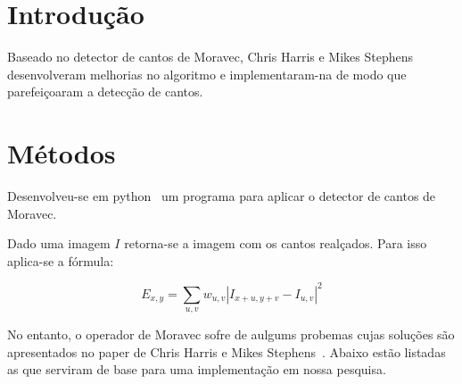 \documentclass[10pt,a4paper]{article}
\begin{document}
\vspace{2mm}
\newpage

\section{Introdução}

Baseado no detector de cantos de Moravec, Chris Harris e
Mikes Stephens~\cite{paper} desenvolveram melhorias no algoritmo e
implementaram-na de modo que parefeiçoaram a detecção de cantos.

\section{Métodos}

Desenvolveu-se em python~\cite{python} um programa para aplicar o
detector de cantos de Moravec.

Dado uma imagem $I$ retorna-se a imagem com os cantos realçados.
Para isso aplica-se a fórmula:

\begin{equation}
E_{x,y}=\sum_{u,v}w_{u,v}\left | I_{x+u,y+v}-I_{u,v}  \right |^2
\end{equation}

No entanto, o operador de Moravec sofre de aulgums probemas cujas soluções são apresentados no paper de  Chris Harris e
Mikes Stephens~\cite{paper}. Abaixo estão listadas as que serviram de
base para uma implementação  em
nossa pesquisa. 
\end{document}

